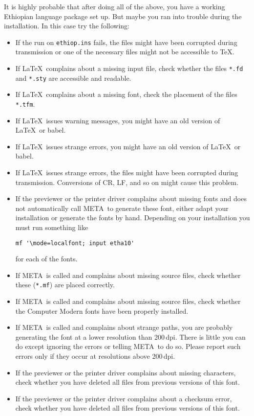 \documentclass[a4paper]{article}
\newcommand*\MF{{\manual META}\-{\manual FONT}}
\newcommand*\babel{\textsf{babel}}
\begin{document}
It is highly probable that after doing all of the above,
you have a working Ethiopian language package set up.
But maybe you ran into trouble during the installation.
In this case try the following:

\begin{itemize}
\item  If the run on \texttt{ethiop.ins} fails, the files
    might have been corrupted during transmission or one of
    the necessary files might not be accessible to \TeX.
\item  If \LaTeX\ complains about a missing input file, check whether
    the files \texttt{*.fd} and \texttt{*.sty} are accessible and readable.
\item  If \LaTeX\ complains about a missing font, check the
    placement of the files \texttt{*.tfm}.
\item  If \LaTeX\ issues warning messages, you might have an old version
    of \LaTeX\ or \babel.
\item  If \LaTeX\ issues strange errors, you might have an old version
    of \LaTeX\ or \babel.
\item  If \LaTeX\ issues strange errors, the files might have been
    corrupted during transmission. Conversions of CR, LF, and
    so on might cause this problem.
\item  If the previewer or the printer driver complains about missing
    fonts and does not automatically call \MF\ to generate
    these font, either adapt your installation or generate
    the fonts by hand. Depending on your installation you
    must run something like
\begin{verbatim}
mf '\mode=localfont; input etha10'
\end{verbatim}
    for each of the fonts.
\item  If \MF\ is called and complains about missing source
    files, check whether these (\texttt{*.mf}) are placed
    correctly.
\item  If \MF\ is called and complains about missing source
    files, check whether the Computer Modern fonts have been
    properly installed.
\item  If \MF\ is called and complains about strange paths,
    you are probably generating the
    font at a lower resolution than 200\,dpi.
    There is little you can do except ignoring the errors or
    telling \MF\ to do so. Please report such errors only
    if they occur at resolutions above 200\,dpi.
\item  If the previewer or the printer driver complains about missing
    characters, check whether you have deleted all files from
    previous versions of this font.
\item  If the previewer or the printer driver complains about a
    checksum error, check whether you have deleted all files from
    previous versions of this font.
\end{itemize}
\end{document}
